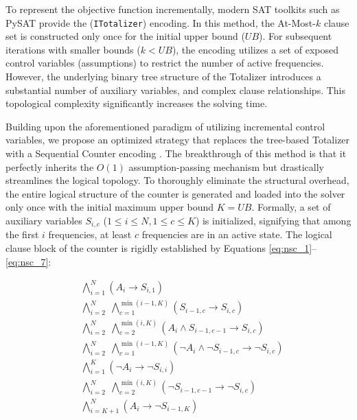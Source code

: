 \documentclass[letterpaper,journal]{IEEEtran}
\begin{document}
To represent the objective function incrementally, modern SAT toolkits such as PySAT \cite{imms-sat18, itk-sat24} provide the (\texttt{ITotalizer}) encoding. 
In this method, the At-Most-$k$ clause set is constructed only once for the initial upper bound ($UB$). For subsequent iterations with smaller bounds ($k < UB$), the encoding utilizes a set of exposed control variables (assumptions) to restrict the number of active frequencies. 
However, the underlying binary tree structure of the Totalizer introduces a substantial number of auxiliary variables, and complex clause relationships. This topological complexity significantly increases the solving time.

Building upon the aforementioned paradigm of utilizing incremental control variables, we propose an optimized strategy that replaces the tree-based Totalizer with a Sequential Counter encoding \cite{Sinz2005}. The breakthrough of this method is that it perfectly inherits the $O(1)$ assumption-passing mechanism but drastically streamlines the logical topology. To thoroughly eliminate the structural overhead, the entire logical structure of the counter is generated and loaded into the solver only once with the initial maximum upper bound $K = UB$. Formally, a set of auxiliary variables $S_{i,c}$ ($1 \le i \le N, 1 \le c \le K$) is initialized, signifying that among the first $i$ frequencies, at least $c$ frequencies are in an active state. The logical clause block of the counter is rigidly established by Equations \eqref{eq:nsc_1}--\eqref{eq:nsc_7}:

\begin{align}
    & \bigwedge_{i=1}^{N} \left( A_i \rightarrow S_{i,1} \right) \label{eq:nsc_1} \\
    & \bigwedge_{i=2}^{N} \;\bigwedge_{c=1}^{\min(i-1,K)} \left( S_{i-1,c} \rightarrow S_{i,c} \right) \label{eq:nsc_2} \\
    & \bigwedge_{i=2}^{N} \;\bigwedge_{c=2}^{\min(i,K)} \left( A_i \land S_{i-1,c-1} \rightarrow S_{i,c} \right) \label{eq:nsc_3} \\
    & \bigwedge_{i=2}^{N} \;\bigwedge_{c=1}^{\min(i-1,K)} \left( \neg A_i \land \neg S_{i-1,c} \rightarrow \neg S_{i,c} \right) \label{eq:nsc_4} \\
    & \bigwedge_{i=1}^{K} \left( \neg A_i \rightarrow \neg S_{i,i} \right) \label{eq:nsc_5} \\
    & \bigwedge_{i=2}^{N} \;\bigwedge_{c=2}^{\min(i,K)} \left( \neg S_{i-1,c-1} \rightarrow \neg S_{i,c} \right) \label{eq:nsc_6} \\
    & \bigwedge_{i=K+1}^{N} \left( A_i \rightarrow \neg S_{i-1,K} \right) \label{eq:nsc_7}
\end{align}
\end{document}
